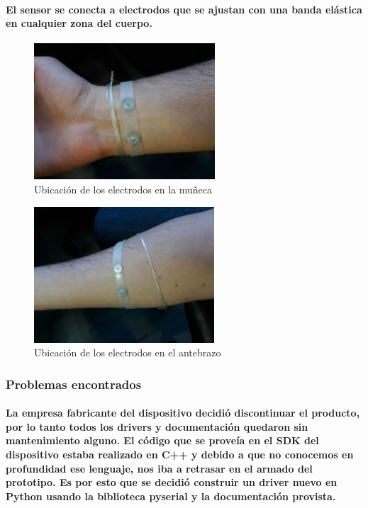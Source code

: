 \documentclass{article}
\begin{document}
\paragraph{
El sensor se conecta a electrodos que se ajustan con una banda elástica en cualquier zona del cuerpo.
}

\begin{figure}[ht]
    \centering
    \includegraphics[height=2in]{electrodo_munieca.png}%
    \caption{Ubicación de los electrodos en la muñeca}
    \label{fig:electrodos1}
\end{figure}

\begin{figure}[ht]
    \centering
    \includegraphics[height=2in]{electrodo_antebrazo.png}%
    \caption{Ubicación de los electrodos en el antebrazo}
    \label{fig:electrodos2}
\end{figure}

\subsubsection{Problemas encontrados}
\paragraph{
La empresa fabricante del dispositivo decidió discontinuar el producto, por lo tanto todos los drivers y documentación quedaron sin mantenimiento alguno. El código que se proveía en el SDK del dispositivo estaba realizado en C++ y debido a que no conocemos en profundidad ese lenguaje, nos iba a retrasar en el armado del prototipo. Es por esto que se decidió construir un driver nuevo en Python usando la biblioteca pyserial y la documentación provista.
}
\end{document}
